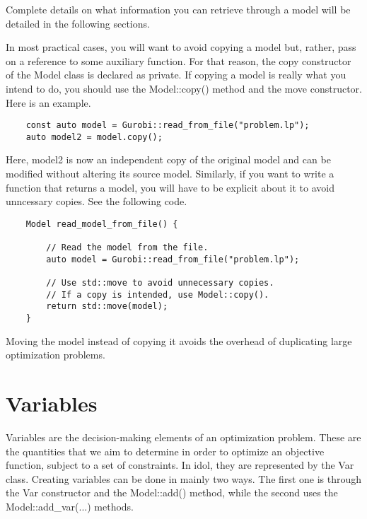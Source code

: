 Complete details on what information you can retrieve through a model will be
detailed in the following sections. 

In most practical cases, you will want to avoid copying a model but, rather,
pass on a reference to some auxiliary function. For that reason, the copy
constructor of the \textsf{Model} class is declared as \textsf{private}. If
copying a model is really what you intend to do, you should use the
\textsf{Model::copy()} method and the move constructor. Here is an example. 

\begin{lstlisting}
    const auto model = Gurobi::read_from_file("problem.lp");
    auto model2 = model.copy();
\end{lstlisting}
Here, \textsf{model2} is now an independent copy of the original model and can
be modified without altering its source model. Similarly, if you want to write
a function that returns a model, you will have to be explicit about it to
avoid unncessary copies. See the following code.

\begin{lstlisting}
    Model read_model_from_file() {
        
        // Read the model from the file.
        auto model = Gurobi::read_from_file("problem.lp");

        // Use std::move to avoid unnecessary copies.
        // If a copy is intended, use Model::copy().
        return std::move(model); 
    }
\end{lstlisting}

Moving the model instead of copying it avoids the overhead of duplicating
large optimization problems.

\section{Variables}

Variables are the decision-making elements of an optimization problem. These
are the quantities that we aim to determine in order to optimize an objective
function, subject to a set of constraints. In \textsf{idol}, they are
represented by the \textsf{Var} class. Creating variables can be done in
mainly two ways. The first one is through the \textsf{Var} constructor and the
\textsf{Model::add()} method, while the second uses the
\textsf{Model::add\_var(...)} methods.

